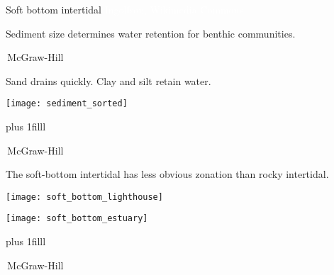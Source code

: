 \documentclass[t]{beamer}
\begin{document}

{
\begin{frame}[b]{Soft bottom intertidal}
\tiny\textcolor{white}{Ingolfson, Wikimedia Commons.}
\end{frame}
}
%
{
\begin{frame}[b]{Sediment size determines water retention for benthic communities.}

\tiny\textcopyright\,McGraw-Hill
\end{frame}}

%
%	
%
%
%
\begin{frame}[t]{Sand drains quickly. Clay and silt retain water.}

	\texttt{[image: sediment\_sorted]}
	
	\vskip0pt plus 1filll

	\tiny\textcopyright\,McGraw-Hill

\end{frame}
%
\begin{frame}[t]{The soft-bottom intertidal has less obvious zonation than rocky intertidal.}

	\vspace*{-\baselineskip}

	\begin{multicols}{2}

		\begin{center}
			\texttt{[image: soft\_bottom\_lighthouse]}
		\end{center}

	\columnbreak

		\begin{center}
			\texttt{[image: soft\_bottom\_estuary]}
		\end{center}

	\end{multicols}

	\vspace*{-0.5\baselineskip}
	
	\vskip0pt plus 1filll

	\tiny\textcopyright\,McGraw-Hill

\end{frame}
\end{document}
